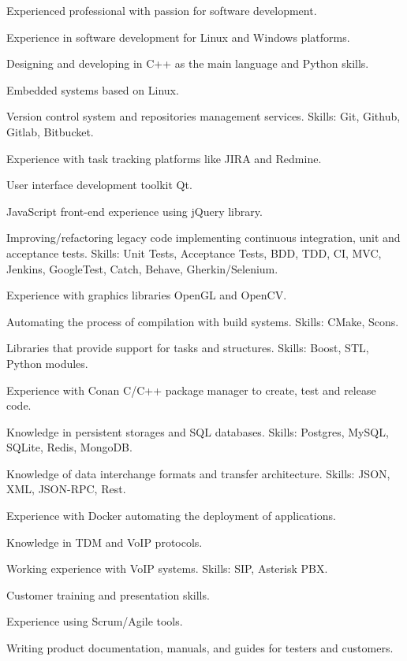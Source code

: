 

\begin{cventries}

  \begin{cvitems}
    \item {Experienced professional with passion for software development.}
    \item {Experience in software development for Linux and Windows platforms.}
    \item {Designing and developing in C++ as the main language and Python skills.}
    \item {Embedded systems based on Linux.}
    \item {Version control system and repositories management services. Skills: Git, Github, Gitlab, Bitbucket.}
    \item {Experience with task tracking platforms like JIRA and Redmine.}
    \item {User interface development toolkit Qt.}
    \item {JavaScript front-end experience using jQuery library.}
    \item {Improving/refactoring legacy code implementing continuous integration, unit and acceptance tests.
    Skills: Unit Tests, Acceptance Tests, BDD, TDD, CI, MVC, Jenkins, GoogleTest, Catch, Behave,
    Gherkin/Selenium.}
    \item {Experience with graphics libraries OpenGL and OpenCV.}
    \item {Automating the process of compilation with build systems. Skills: CMake, Scons.}
    \item {Libraries that provide support for tasks and structures. Skills: Boost, STL, Python modules.}
    \item {Experience with Conan C/C++ package manager to create, test and release code.}
    \item {Knowledge in persistent storages and SQL databases. Skills: Postgres, MySQL, SQLite, Redis,
    MongoDB.}
    \item {Knowledge of data interchange formats and transfer architecture. Skills: JSON, XML, JSON-RPC,
    Rest.}
    \item {Experience with Docker automating the deployment of applications.}
    \item {Knowledge in TDM and VoIP protocols.}
    \item {Working experience with VoIP systems. Skills: SIP, Asterisk PBX.}
    \item {Customer training and presentation skills.}
    \item {Experience using Scrum/Agile tools.}
    \item {Writing product documentation, manuals, and guides for testers and customers.}
  \end{cvitems}
\end{cventries}
